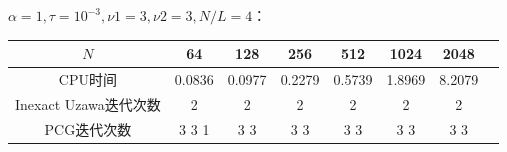 \documentclass{article}
\begin{document}
$\alpha = 1, \tau = 10^{-3}, \nu1 = 3, \nu2 = 3, N/L = 4$：
\begin{table}[!h]
  \centering
  \begin{tabular}{cccccccc}
    \toprule
    $N$ & 64 & 128 & 256 & 512 & 1024 & 2048  \\
    \midrule
    CPU时间 & 0.0836 & 0.0977 & 0.2279 & 0.5739 & 1.8969 & 8.2079  \\
    Inexact Uzawa迭代次数 & 2 & 2 & 2 & 2 & 2 & 2 \\
    PCG迭代次数 & 3 3 1 & 3 3 & 3 3 & 3 3 & 3 3 & 3 3 \\
    \bottomrule
  \end{tabular}
\end{table}

\cite{Vcycle} 

 
\end{document}
